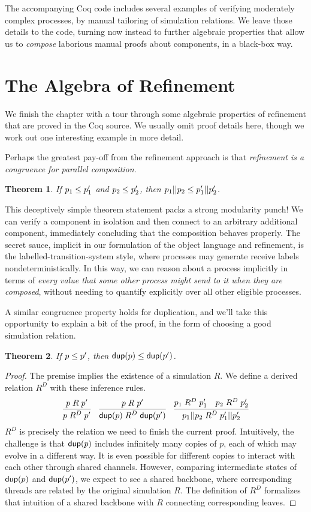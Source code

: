 \documentclass{amsbook}
\newtheorem{theorem}{Theorem}[chapter]
\theoremstyle{definition}
\theoremstyle{remark}
\numberwithin{section}{chapter}
\numberwithin{equation}{chapter}
\begin{document}
The accompanying Coq code includes several examples of verifying moderately complex processes, by manual tailoring of simulation relations.
We leave those details to the code, turning now instead to further algebraic properties that allow us to \emph{compose} laborious manual proofs about components, in a black-box way.


\section{The Algebra of Refinement}

We finish the chapter with a tour through some algebraic properties of refinement that are proved in the Coq source.
We usually omit proof details here, though we work out one interesting example in more detail.

Perhaps the greatest pay-off from the refinement approach is that \emph{refinement is a congruence for parallel composition}.
\begin{theorem}
  If $p_1 \leq p'_1$ and $p_2 \leq p'_2$, then $p_1 || p_2 \leq p'_1 || p'_2$.
\end{theorem}

\modularity
This deceptively simple theorem statement packs a strong modularity punch!
We can verify a component in isolation and then connect to an arbitrary additional component, immediately concluding that the composition behaves properly.
The secret sauce, implicit in our formulation of the object language and refinement, is the labelled-transition-system style, where processes may generate receive labels nondeterministically.
In this way, we can reason about a process implicitly in terms of \emph{every value that some other process might send to it when they are composed}, without needing to quantify explicitly over all other eligible processes.

A similar congruence property holds for duplication, and we'll take this opportunity to explain a bit of the proof, in the form of choosing a good simulation relation.
\begin{theorem}
  If $p \leq p'$, then $\mathsf{dup}(p) \leq \mathsf{dup}(p')$.
\end{theorem}
\begin{proof}
  The premise implies the existence of a simulation $R$.
  We define a derived relation $R^D$ with these inference rules.
  $$\infer{p \; R^D \; p'}{
    p \; R \; p'
  }
  \quad \infer{\dup{p} \; R^D \; \dup{p'}}{
    p \; R \; p'
  }
  \quad \infer{\parl{p_1}{p_2} \; R^D \; \parl{p'_1}{p'_2}}{
    p_1 \; R^D \; p'_1
    & p_2 \; R^D \; p'_2
  }$$
  $R^D$ is precisely the relation we need to finish the current proof.
  Intuitively, the challenge is that $\mathsf{dup}(p)$ includes infinitely many copies of $p$, each of which may evolve in a different way.
  It is even possible for different copies to interact with each other through shared channels.
  However, comparing intermediate states of $\mathsf{dup}(p)$ and $\mathsf{dup}(p')$, we expect to see a shared backbone, where corresponding threads are related by the original simulation $R$.
  The definition of $R^D$ formalizes that intuition of a shared backbone with $R$ connecting corresponding leaves.
\end{proof}
\end{document}
